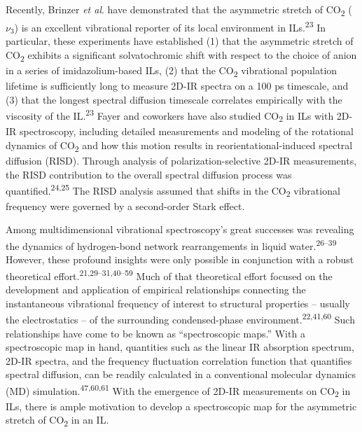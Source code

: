 \documentclass[]{article}
\begin{document}
Recently, Brinzer \emph{et al}. have demonstrated that the asymmetric
stretch of CO\textsubscript{2} (\(\nu_3\)) is an excellent
vibrational reporter of its local environment in
ILs.\textsuperscript{23} In particular, these experiments have
established (1) that the asymmetric stretch of CO\textsubscript{2}
exhibits a significant solvatochromic shift with respect to the choice
of anion in a series of imidazolium-based ILs, (2) that the
CO\textsubscript{2} vibrational population lifetime is sufficiently long
to measure 2D-IR spectra on a 100 ps timescale, and (3) that the longest
spectral diffusion timescale correlates empirically with the viscosity
of the IL.\textsuperscript{23} Fayer and coworkers have also studied
CO\textsubscript{2} in ILs with 2D-IR spectroscopy, including detailed
measurements and modeling of the rotational dynamics of
CO\textsubscript{2} and how this motion results in
reorientational-induced spectral diffusion (RISD). Through analysis of
polarization-selective 2D-IR measurements, the RISD contribution to the
overall spectral diffusion process was
quantified.\textsuperscript{24,25} The RISD analysis assumed that shifts
in the CO\textsubscript{2} vibrational frequency were governed by a
second-order Stark effect.

Among multidimensional vibrational spectroscopy's great successes was
revealing the dynamics of hydrogen-bond network rearrangements in liquid
water.\textsuperscript{26--39} However, these profound insights were
only possible in conjunction with a robust theoretical
effort.\textsuperscript{21,29--31,40--59} Much of that theoretical
effort focused on the development and application of empirical
relationships connecting the instantaneous vibrational frequency of
interest to structural properties -- usually the electrostatics -- of
the surrounding condensed-phase environment.\textsuperscript{22,41,60}
Such relationships have come to be known as ``spectroscopic maps.'' With
a spectroscopic map in hand, quantities such as the linear IR absorption
spectrum, 2D-IR spectra, and the frequency fluctuation correlation
function that quantifies spectral diffusion, can be readily calculated
in a conventional molecular dynamics (MD)
simulation.\textsuperscript{47,60,61} With the emergence of 2D-IR
measurements on CO\textsubscript{2} in ILs, there is ample motivation to
develop a spectroscopic map for the asymmetric stretch of
CO\textsubscript{2} in an IL.
\end{document}
